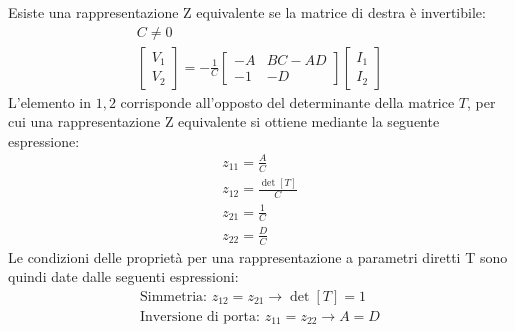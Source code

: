 \documentclass{article}
\numberwithin{equation}{subsection}
\begin{document}
Esiste una rappresentazione Z equivalente se la matrice di destra è invertibile:
\begin{gather*}
    C\neq0\\
    \displaystyle\begin{bmatrix}
        V_1\\V_2
    \end{bmatrix}=-\frac{1}{C}\begin{bmatrix}
        -A&BC-AD\\-1&-D
    \end{bmatrix}\begin{bmatrix}
        I_1\\I_2
    \end{bmatrix}
\end{gather*}
L'elemento in $1,2$ corrisponde all'opposto del determinante della matrice $T$, per cui una rappresentazione Z equivalente si ottiene mediante la seguente espressione:
\begin{gather*}
    z_{11}=\displaystyle\frac{A}{C}\\
    z_{12}=\displaystyle\frac{\det[T]}{C}\\
    z_{21}=\displaystyle\frac{1}{C}\\
    z_{22}=\displaystyle\frac{D}{C}
\end{gather*}
Le condizioni delle proprietà per una rappresentazione a parametri diretti T sono quindi date dalle seguenti espressioni:
\begin{gather*}\label{eq:condizioni-parametri-diretti}
    \mbox{Simmetria: }z_{12}=z_{21}\to \det[T]=1\\
    \mbox{Inversione di porta: }z_{11}=z_{22}\to A=D
\end{gather*}
\end{document}
